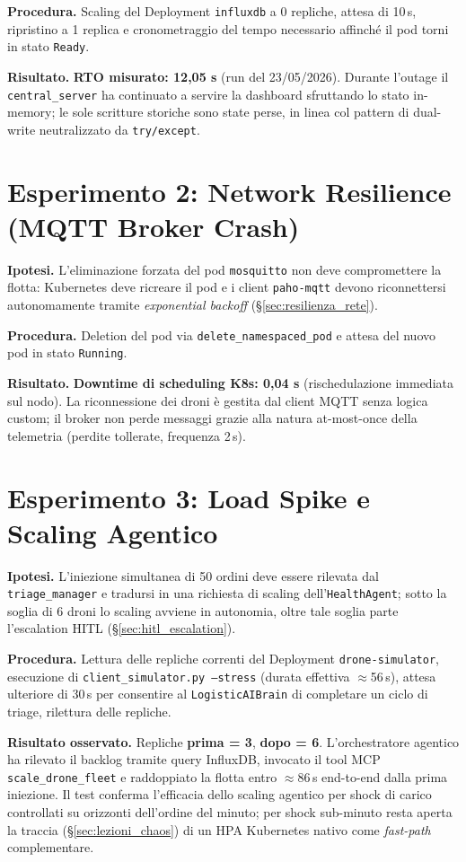 \textbf{Procedura.} Scaling del Deployment \texttt{influxdb} a 0 repliche, attesa di 10\,s, ripristino a 1 replica e cronometraggio del tempo necessario affinché il pod torni in stato \texttt{Ready}.

\textbf{Risultato.} \textbf{RTO misurato: 12{,}05 s} (run del 23/05/2026). Durante l'outage il \texttt{central\_server} ha continuato a servire la dashboard sfruttando lo stato in-memory; le sole scritture storiche sono state perse, in linea col pattern di dual-write neutralizzato da \texttt{try/except}.

\section{Esperimento 2: Network Resilience (MQTT Broker Crash)}
\label{sec:esperimento_2_mqtt}
\textbf{Ipotesi.} L'eliminazione forzata del pod \texttt{mosquitto} non deve compromettere la flotta: Kubernetes deve ricreare il pod e i client \texttt{paho-mqtt} devono riconnettersi autonomamente tramite \textit{exponential backoff} (§\ref{sec:resilienza_rete}).

\textbf{Procedura.} Deletion del pod via \texttt{delete\_namespaced\_pod} e attesa del nuovo pod in stato \texttt{Running}.

\textbf{Risultato.} \textbf{Downtime di scheduling K8s: 0{,}04 s} (rischedulazione immediata sul nodo). La riconnessione dei droni è gestita dal client MQTT senza logica custom; il broker non perde messaggi grazie alla natura at-most-once della telemetria (perdite tollerate, frequenza 2\,s).

\section{Esperimento 3: Load Spike e Scaling Agentico}
\label{sec:esperimento_3_load}
\textbf{Ipotesi.} L'iniezione simultanea di 50 ordini deve essere rilevata dal \texttt{triage\_manager} e tradursi in una richiesta di scaling dell'\texttt{HealthAgent}; sotto la soglia di 6 droni lo scaling avviene in autonomia, oltre tale soglia parte l'escalation HITL (§\ref{sec:hitl_escalation}).

\textbf{Procedura.} Lettura delle repliche correnti del Deployment \texttt{drone-simulator}, esecuzione di \texttt{client\_simulator.py --stress} (durata effettiva $\approx$56\,s), attesa ulteriore di 30\,s per consentire al \texttt{LogisticAIBrain} di completare un ciclo di triage, rilettura delle repliche.

\textbf{Risultato osservato.} Repliche \textbf{prima = 3}, \textbf{dopo = 6}. L'orchestratore agentico ha rilevato il backlog tramite query InfluxDB, invocato il tool MCP \texttt{scale\_drone\_fleet} e raddoppiato la flotta entro $\approx$86\,s end-to-end dalla prima iniezione. Il test conferma l'efficacia dello scaling agentico per shock di carico controllati su orizzonti dell'ordine del minuto; per shock sub-minuto resta aperta la traccia (§\ref{sec:lezioni_chaos}) di un HPA Kubernetes nativo come \emph{fast-path} complementare.

